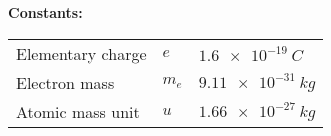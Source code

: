 \documentclass[../TST.tex]{subfiles}
\begin{document}
\ifprob 
\vspace*{2ex}
\textbf{Constants:}\\[5pt]
\begin{tabular}{@{}lll@{}}
Elementary charge & $e$  & $\qty{1.6e-19}{C}$  \\
Electron mass & $m_e$  & $\qty{9.11e-31}{kg}$  \\
Atomic mass unit & $u$  & $\qty{1.66e-27}{kg}$  \\
\end{tabular}

\else
\fi
\end{document}
